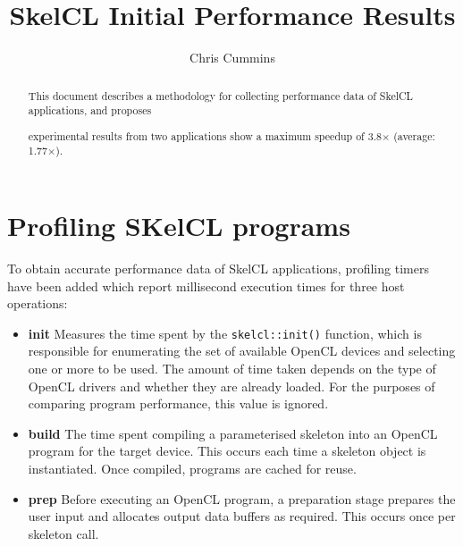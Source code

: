 
\title{SkelCL Initial Performance Results}

\author{Chris Cummins}





\maketitle

\begin{abstract}
  \noindent
  This document describes a methodology for collecting performance
  data of SkelCL applications, and proposes

  experimental results from two applications show a maximum speedup of
  3.8$\times$ (average: 1.77$\times$).
\end{abstract}

\section{Profiling SKelCL programs}

To obtain accurate performance data of SkelCL applications, profiling
timers have been added which report millisecond execution times for
three host operations:

\begin{itemize}
\item \textbf{init} Measures the time spent by the
  \texttt{skelcl::init()} function, which is responsible for
  enumerating the set of available OpenCL devices and selecting one or
  more to be used. The amount of time taken depends on the type of
  OpenCL drivers and whether they are already loaded. For the purposes
  of comparing program performance, this value is ignored.

\item \textbf{build} The time spent compiling a parameterised skeleton
  into an OpenCL program for the target device. This occurs each time
  a skeleton object is instantiated. Once compiled, programs are
  cached for reuse.

\item \textbf{prep} Before executing an OpenCL program, a preparation
  stage prepares the user input and allocates output data buffers as
  required. This occurs once per skeleton call.
\end{itemize}

